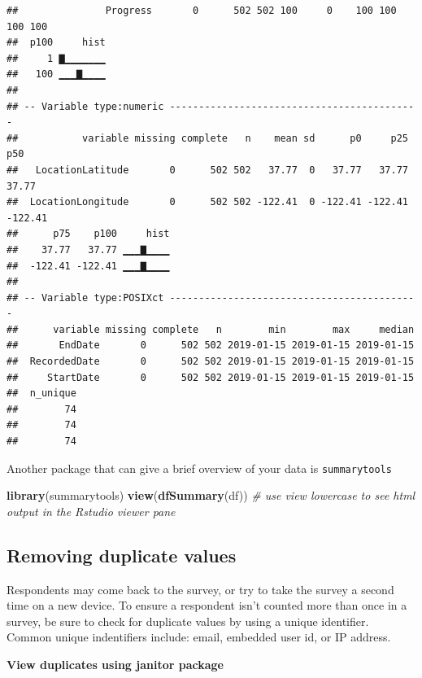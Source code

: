 \documentclass[]{book}
\newenvironment{Shaded}{\begin{snugshade}}{\end{snugshade}}
\newcommand{\KeywordTok}[1]{\textcolor[rgb]{0.13,0.29,0.53}{\textbf{#1}}}
\newcommand{\StringTok}[1]{\textcolor[rgb]{0.31,0.60,0.02}{#1}}
\newcommand{\CommentTok}[1]{\textcolor[rgb]{0.56,0.35,0.01}{\textit{#1}}}
\newcommand{\OperatorTok}[1]{\textcolor[rgb]{0.81,0.36,0.00}{\textbf{#1}}}
\newcommand{\NormalTok}[1]{#1}
\begin{document}
\begin{verbatim}
##               Progress       0      502 502 100     0    100 100 100 100
##  p100     hist
##     1 ▇▁▁▁▁▁▁▁
##   100 ▁▁▁▇▁▁▁▁
## 
## -- Variable type:numeric -------------------------------------------
##           variable missing complete   n    mean sd      p0     p25     p50
##   LocationLatitude       0      502 502   37.77  0   37.77   37.77   37.77
##  LocationLongitude       0      502 502 -122.41  0 -122.41 -122.41 -122.41
##      p75    p100     hist
##    37.77   37.77 ▁▁▁▇▁▁▁▁
##  -122.41 -122.41 ▁▁▁▇▁▁▁▁
## 
## -- Variable type:POSIXct -------------------------------------------
##      variable missing complete   n        min        max     median
##       EndDate       0      502 502 2019-01-15 2019-01-15 2019-01-15
##  RecordedDate       0      502 502 2019-01-15 2019-01-15 2019-01-15
##     StartDate       0      502 502 2019-01-15 2019-01-15 2019-01-15
##  n_unique
##        74
##        74
##        74
\end{verbatim}

Another package that can give a brief overview of your data is
\texttt{summarytools}

\begin{Shaded}
\begin{Highlighting}[]
\KeywordTok{library}\NormalTok{(summarytools)}
\KeywordTok{view}\NormalTok{(}\KeywordTok{dfSummary}\NormalTok{(df)) }\CommentTok{# use view lowercase to see html output in the Rstudio viewer pane}
\end{Highlighting}
\end{Shaded}

\subsection{Removing duplicate values}\label{removing-duplicate-values}

Respondents may come back to the survey, or try to take the survey a
second time on a new device. To ensure a respondent isn't counted more
than once in a survey, be sure to check for duplicate values by using a
unique identifier. Common unique indentifiers include: email, embedded
user id, or IP address.

\textbf{View duplicates using janitor package}

\begin{Shaded}
\end{Shaded}
\end{document}

